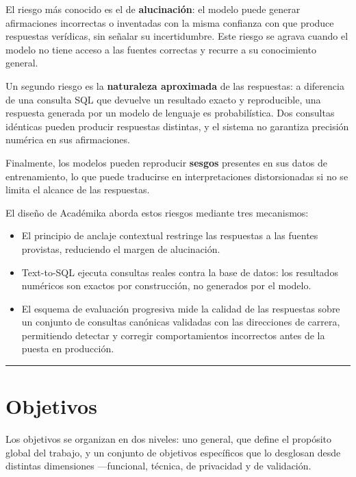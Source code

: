 \documentclass[
  spanish,
]{article}
\begin{document}
El riesgo más conocido es el de \textbf{alucinación}: el modelo puede generar afirmaciones incorrectas
o inventadas con la misma confianza con que produce respuestas verídicas, sin señalar su incertidumbre.
Este riesgo se agrava cuando el modelo no tiene acceso a las fuentes correctas y recurre a su conocimiento general.

Un segundo riesgo es la \textbf{naturaleza aproximada} de las respuestas: a diferencia de una consulta SQL
que devuelve un resultado exacto y reproducible, una respuesta generada por un modelo de lenguaje es probabilística.
Dos consultas idénticas pueden producir respuestas distintas,
y el sistema no garantiza precisión numérica en sus afirmaciones.

Finalmente, los modelos pueden reproducir \textbf{sesgos} presentes en sus datos de entrenamiento,
lo que puede traducirse en interpretaciones distorsionadas si no se limita el alcance de las respuestas.

\pagebreak

El diseño de Académika aborda estos riesgos mediante tres mecanismos: 

\begin{itemize}
  \item El principio de anclaje contextual restringe las respuestas a las fuentes provistas, reduciendo el margen de alucinación.
  \item Text-to-SQL ejecuta consultas reales contra la base de datos: los resultados numéricos son exactos por construcción, no generados por el modelo.
  \item El esquema de evaluación progresiva mide la calidad de las respuestas sobre un conjunto de consultas
  canónicas validadas con las direcciones de carrera, permitiendo detectar y corregir comportamientos
  incorrectos antes de la puesta en producción.
\end{itemize}

\begin{center}\rule{0.5\linewidth}{0.5pt}\end{center}

\section{Objetivos}\label{objetivos}

Los objetivos se organizan en dos niveles: uno general, que define el propósito global del trabajo,
y un conjunto de objetivos específicos que lo desglosan desde distintas dimensiones ---funcional,
técnica, de privacidad y de validación.
\end{document}
